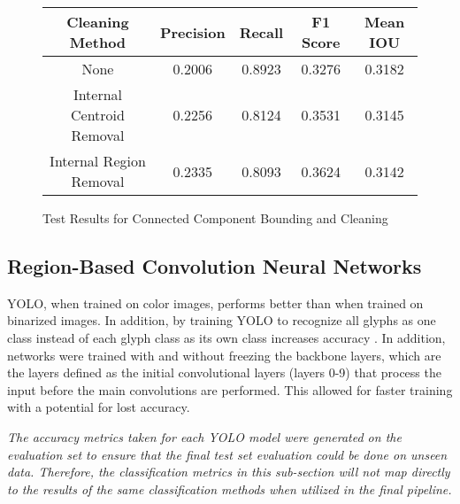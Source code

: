 \begin{figure}[H]
    \caption{Test Results for Connected Component Bounding and Cleaning}
    \label{fig:ccBoundingEval}
    \centering
    \begin{tabular}{ | c | c | c | c | c | }
        \hline
        Cleaning Method & Precision & Recall & F1 Score & Mean IOU \\
        \hline
        None & 0.2006 & 0.8923 & 0.3276 & 0.3182 \\
        Internal Centroid Removal & 0.2256 & 0.8124 & 0.3531 & 0.3145 \\
        Internal Region Removal & 0.2335 & 0.8093 & 0.3624 & 0.3142 \\
        \hline
    \end{tabular}
\end{figure}

\subsection{Region-Based Convolution Neural Networks}

YOLO, when trained on color images, performs better than when trained on binarized images. In addition, by training YOLO to recognize all glyphs as one class instead of each glyph class as its own class increases accuracy . In addition, networks were trained with and without freezing the backbone layers, which are the layers defined as the initial convolutional layers (layers 0-9) \cite{YoloBackbone} that process the input before the main convolutions are performed. This allowed for faster training with a potential for lost accuracy.

\textit{The accuracy metrics taken for each YOLO model were generated on the evaluation set to ensure that the final test set evaluation could be done on unseen data. Therefore, the classification metrics in this sub-section will not map directly to the results of the same classification methods when utilized in the final pipeline.}

